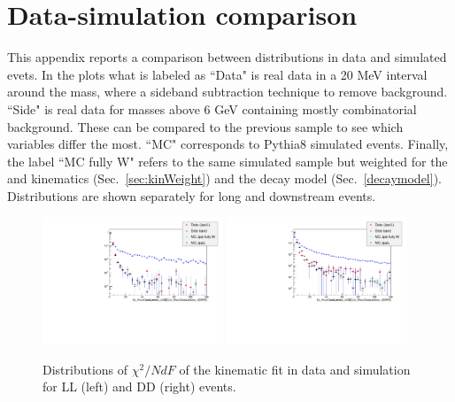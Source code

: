 \chapter{Data-simulation comparison}
\label{app:MC_data_comp}

This appendix reports a comparison between distributions in data and simulated \Lb\to\jpsi\Lz evets.
%
In the plots what is labeled as ``Data" is real data in a 20 MeV interval around the \Lb mass,
where a sideband subtraction technique to remove background. ``Side" is real data for masses
above 6 GeV containing mostly combinatorial background. These can be compared to the previous
sample to see which variables differ the most.
``MC" corresponds to Pythia8 \Lb\to\jpsi\Lz simulated events. %
Finally, the label ``MC fully W" refers to the same simulated sample but weighted for the
\Lb and \Lz kinematics (Sec.~\ref{sec:kinWeight}) and the decay model (Sec.~\ref{decaymodel}).
Distributions are shown separately for long and downstream events.


\begin{figure}[h!]
\centering
\includegraphics[width=0.48\textwidth]{Lmumu/figs/MC_data_comp/Lb_MassConsLambda_chi20Lb_MassConsLambda_nDOF0_plotLL.pdf}
\includegraphics[width=0.48\textwidth]{Lmumu/figs/MC_data_comp/Lb_MassConsLambda_chi20Lb_MassConsLambda_nDOF0_plotDD.pdf}
\caption{ Distributions of $\chi^2/NdF$ of the kinematic fit in data and simulation for LL (left) and DD (right) events.   }
\end{figure}


